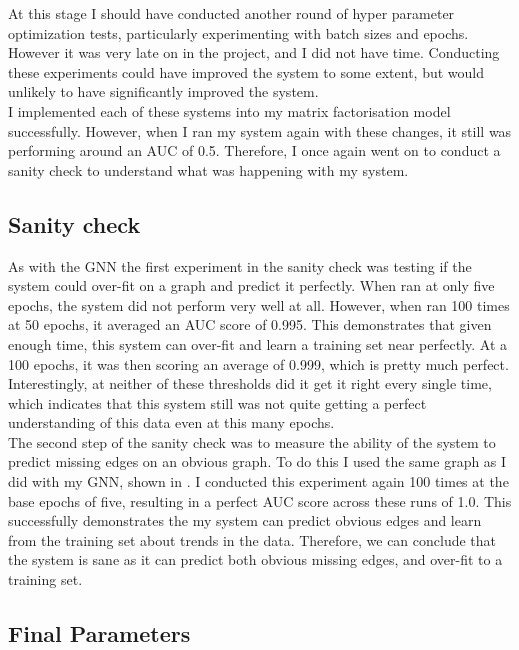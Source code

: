 \documentclass{l4proj}
\begin{document}
At this stage I should have conducted another round of hyper parameter optimization tests, particularly experimenting with batch sizes and epochs. However it was very late on in the project, and I did not have time. Conducting these experiments could have improved the system to some extent, but would unlikely to have significantly improved the system. \\

I implemented each of these systems into my matrix factorisation model successfully. However, when I ran my system again with these changes, it still was performing around an AUC of 0.5. Therefore, I once again went on to conduct a sanity check to understand what was happening with my system. \\

\subsection{Sanity check}

As with the GNN the first experiment in the sanity check was testing if the system could over-fit on a graph and predict it perfectly. When ran at only five epochs, the system did not perform very well at all. However, when ran 100 times at 50 epochs, it averaged an AUC score of 0.995. This demonstrates that given enough time, this system can over-fit and learn a training set near perfectly. At a 100 epochs, it was then scoring an average of 0.999, which is pretty much perfect. Interestingly, at neither of these thresholds did it get it right every single time, which indicates that this system still was not quite getting a perfect understanding of this data even at this many epochs. \\

The second step of the sanity check was to measure the ability of the system to predict missing edges on an obvious graph. To do this I used the same graph as I did with my GNN, shown in . I conducted this experiment again 100 times at the base epochs of five, resulting in a perfect AUC score across these runs of 1.0. This successfully demonstrates the my system can predict obvious edges and learn from the training set about trends in the data. Therefore, we can conclude that the system is sane as it can predict both obvious missing edges, and over-fit to a training set. \\

\subsection{Final Parameters}
\end{document}
